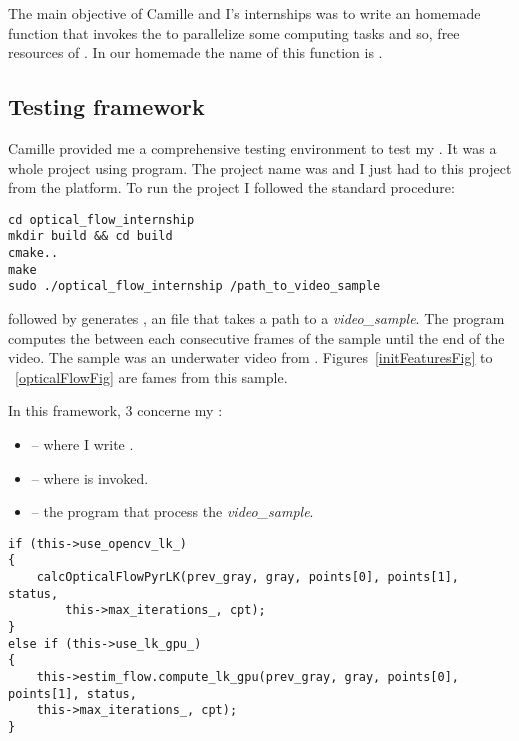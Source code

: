 The main objective of Camille and I's internships was to write an homemade  function that invokes the \vc{} to parallelize some computing tasks and so, free resources of \cpu. In our homemade  the name of this function is .


\subsection{Testing framework}

Camille provided me a comprehensive testing environment to test my . It was a whole  project using  program. The project name was  and I just had to  this project from the  platform. To run the project I followed the standard  procedure:



\begin{lstlisting}
cd optical_flow_internship
mkdir build && cd build
cmake..
make
sudo ./optical_flow_internship /path_to_video_sample
\end{lstlisting}

 followed by  generates , an  file that takes a path to a \emph{video\_sample}. The program computes the \flow{} between each consecutive frames of the sample until the end of the video. The sample was an underwater video from \iBubble. Figures~\ref{initFeaturesFig} to ~\ref{opticalFlowFig} are fames from this sample.

In this framework, 3  concerne my \api{}:
\begin{itemize}
	\item {} -- where I write .
	\item {} -- where  is invoked.
	\item {} -- the  program that process the \emph{video\_sample}.
\end{itemize}


\begin{lstlisting}
if (this->use_opencv_lk_)
{
	calcOpticalFlowPyrLK(prev_gray, gray, points[0], points[1], status,
        this->max_iterations_, cpt);
}
else if (this->use_lk_gpu_)
{
	this->estim_flow.compute_lk_gpu(prev_gray, gray, points[0], points[1], status,
	this->max_iterations_, cpt);
}
\end{lstlisting}

